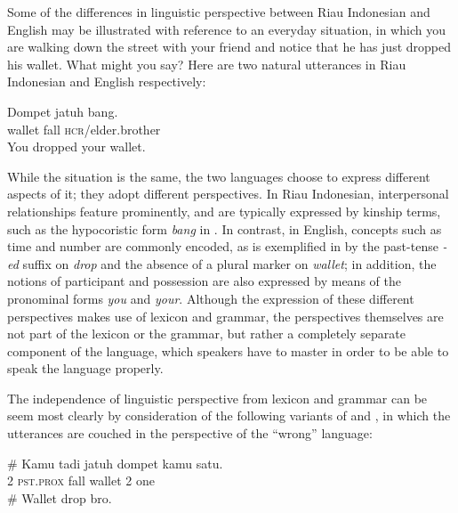 \documentclass[output=paper,colorlinks,citecolor=brown
]{langscibook}
\begin{document}
Some of the differences in linguistic perspective between Riau Indonesian and English may be illustrated with reference to an everyday situation, in which you are walking down the street with your friend and notice that he has just dropped his wallet.  What might you say?  Here are two natural utterances in Riau Indonesian and English respectively:

\ea \label{ex:gil:5}
\gll Dompet	jatuh	bang. \\
    wallet	fall	\textsc{hcr}/elder.brother \\
\ex \label{ex:gil:6}
You dropped your wallet. \\
\z

While the situation is the same, the two languages choose to express different aspects of it; they adopt different perspectives. In Riau Indonesian, interpersonal relationships feature prominently, and are typically expressed by kinship terms, such as the hypocoristic form \textit{bang} in .  In contrast, in English, concepts such as time and number are commonly encoded, as is exemplified in  by the past-tense \textit{-ed} suffix on \textit{drop} and the absence of a plural marker on \textit{wallet}; in addition, the notions of participant and possession are also expressed by means of the pronominal forms \textit{you} and \textit{your}. Although the expression of these different perspectives makes use of lexicon and grammar, the perspectives themselves are not part of the lexicon or the grammar, but rather a completely separate component of the language, which speakers have to master in order to be able to speak the language properly.  

The independence of linguistic perspective from lexicon and grammar can be seem most clearly by consideration of the following variants of  and , in which the utterances are couched in the perspective of the ``wrong'' language:

\ea \label{ex:gil:7}
\gll \# Kamu	tadi	jatuh	dompet	kamu	satu. \\
    { } 2	\textsc{pst.prox}	fall	wallet	2	one \\
\ex \label{ex:gil:8}
\# Wallet drop bro. \\
\z
\end{document}
